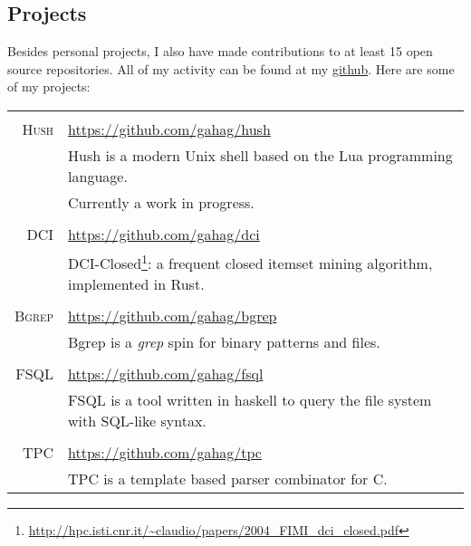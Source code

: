 \documentclass[a4paper,10pt]{article}
\newcommand{\cpp}{C\protect\scalebox{0.8}{\protect\raisebox{0.4ex}{++}}}
\renewcommand\#{\protect\scalebox{0.8}{\protect\raisebox{0.4ex}{\char"0023}}}
\begin{document}
\subsection{Projects}
Besides personal projects, I also have made contributions to at least 15 open source
repositories. All of my activity can be found at my \href{https://github.com/gahag/}{github}.
Here are some of my projects: \\
\begin{tabular}{r|l}
  \multicolumn{2}{c}{} \\
  \textsc{Hush} & \url{https://github.com/gahag/hush} \\[3pt]
  & Hush is a modern Unix shell based on the Lua programming language. \\
  & Currently a work in progress. \\

  \multicolumn{2}{c}{} \\
  \textsc{DCI} & \url{https://github.com/gahag/dci} \\[3pt]
  & DCI-Closed\footnote{\url{http://hpc.isti.cnr.it/~claudio/papers/2004_FIMI_dci_closed.pdf}}:
  a frequent closed itemset mining algorithm, implemented in Rust.  \\

  \multicolumn{2}{c}{} \\
  \textsc{Bgrep} & \url{https://github.com/gahag/bgrep} \\[3pt]
  & Bgrep is a \textit{grep} spin for binary patterns and files. \\

  \multicolumn{2}{c}{} \\
  \textsc{FSQL} & \url{https://github.com/gahag/fsql} \\[3pt]
  & FSQL is a tool written in haskell to query the file system with SQL-like syntax. \\
  
  \multicolumn{2}{c}{} \\
  \textsc{TPC} & \url{https://github.com/gahag/tpc} \\[3pt]
  & TPC is a template based parser combinator for \cpp. \\
\end{tabular}
\end{document}
